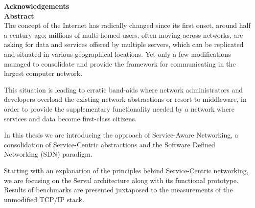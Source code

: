\documentclass[12pt,a4paper,oneside]{article}
\begin{document}
\newcommand{\chapterpage}[2]{
	\newpage
	\thispagestyle{empty}
	\phantomsection
	\addcontentsline{toc}{part}{#1}
	{\Huge \bf \noindent #2}
	\newpage
}


\iffalse 

\fi


\newpage
\pagestyle{empty}
\mbox{}

\newpage
\setcounter{page}{2}


\newpage
\pagestyle{plain}
{\Large \bf \noindent Acknowledgements} \\[0.5cm]


\newpage
\thispagestyle{empty}
{\Large \bf \noindent Abstract} \\[0.13cm]

\noindent The concept of the Internet has radically changed since its first onset, around half a century ago; millions of multi-homed users, often moving across networks, are asking for data and services offered by multiple servers, which can be replicated and situated in various geographical locations.
Yet only a few modifications managed to consolidate and provide the framework for communicating in the largest computer network.

This situation is leading to erratic band-aids where network administrators and developers overload the existing network abstractions or resort to middleware, in order to provide the supplementary functionality needed by a network where services and data become first-class citizens.

In this thesis we are introducing the approach of Service-Aware Networking, a consolidation of Service-Centric abstractions and the Software Defined Networking (SDN) paradigm.

Starting with an explanation of the principles behind Service-Centric networking, we are focusing on the Serval architecture along with its functional prototype.
Results of benchmarks are presented juxtaposed to the measurements of the unmodified TCP/IP stack.
\end{document}
